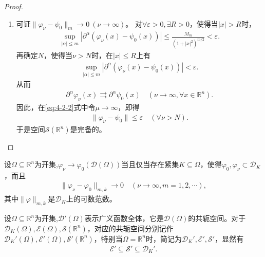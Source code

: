 \documentclass[../../main.tex]{subfiles}%
\begin{document}
\begin{proof}
\begin{enumerate}[(1)]
\item 可证$\|\varphi_\nu-\psi_0\|_m\to0\ (\nu\to\infty)$。
对$\forall\varepsilon>0,\exists R>0$，使得当$|x|>R$时，
\begin{align*}
\sup\limits_{|\alpha|\leqslant m}\left|\partial^\alpha(\varphi_\nu(x)-\psi_0(x))\right|\leqslant\frac{M_m}{(1+|x|^2)^{m/2}}<\varepsilon.
\end{align*}
再确定$N$，使得当$\nu>N$时，在$|x|\leqslant R$上有
\begin{align*}
\sup\limits_{|\alpha|\leqslant m}\left|\partial^\alpha(\varphi_\nu(x)-\psi_0(x))\right|<\varepsilon.
\end{align*}
从而
\begin{align*}
\partial^\alpha\varphi_\nu(x)\rightrightarrows\partial^\alpha\psi_0(x)\quad(\nu\to\infty,\forall x\in\mathbb{R}^n).
\end{align*}
因此，在\eqref{eq:4-2-2}式中令$\mu\to\infty$，即得
\begin{align*}
\|\varphi_\nu-\psi_0\|\leqslant\varepsilon\quad(\forall\nu>N).
\end{align*}
于是空间$\mathscr{S}(\mathbb{R}^n)$是完备的。
\end{enumerate}
\end{proof}

\begin{proposition}
设$\Omega\subseteq\mathbb{R}^n$为开集,$\varphi_\nu\to\varphi_0(\mathscr{D}(\Omega))$当且仅当存在紧集$K\subseteq\Omega$，使得$\varphi_0,\varphi_\nu\subset\mathscr{D}_K$，而且
\begin{align*}
\|\varphi_\nu-\varphi_0\|_{m,k}\to0\quad(\nu\to\infty,m=1,2,\cdots),
\end{align*}
其中$\|\varphi\|_{m,k}$是$\mathscr{D}_K$上的可数范数。
\end{proposition}

\begin{proposition}
设$\Omega\subseteq\mathbb{R}^n$为开集,$\mathscr{D}'(\Omega)$表示广义函数全体，它是$\mathscr{D}(\Omega)$的共轭空间。对于$\mathscr{D}_K(\Omega),\mathscr{E}(\Omega),\mathscr{S}(\mathbb{R}^n)$，对应的共轭空间分别记作$\mathscr{D}_K'(\Omega),\mathscr{E}'(\Omega),\mathscr{S}'(\mathbb{R}^n)$，特别当$\Omega=\mathbb{R}^n$时，简记为$\mathscr{D}_K',\mathscr{E}',\mathscr{S}'$，显然有
\begin{align*}
\mathscr{E}'\subseteq\mathscr{S}'\subseteq\mathscr{D}_K'.
\end{align*}

\end{proposition}
\end{document}
